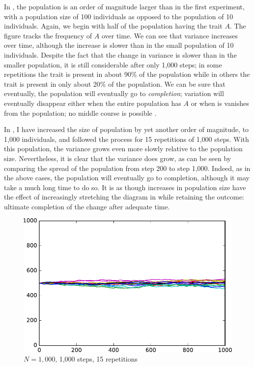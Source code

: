 \documentclass[output=paper]{langsci/langscibook}
\begin{document}
In , the population is an order of magnitude
larger than in the first experiment, with a population size of 100
individuals as opposed to the population of 10 individuals.  Again, we
begin with half of the population having the trait $A$. The figure
tracks the frequency of $A$ over time.  We can see that
variance increases over time, although the increase is slower than in
the small population of 10 individuals.  Despite the fact that the
change in variance is slower than in the smaller population, it is
still considerable after only 1,000 steps; in some repetitions the
trait is present in about 90\% of the population while in others the
trait is present in only about 20\% of the population.  We can be sure
that eventually, the population will eventually go to
\emph{completion}; variation will eventually disappear either when the
entire population has $A$ or when is vanishes from the population; no
middle course is possible \citep{sigmund:1993}.

In , I have increased the size of population by
yet another order of magnitude, to 1,000 individuals, and followed the
process for 15 repetitions of 1,000 steps.  With this population, the
variance grows even more slowly relative to the population size.
Nevertheless, it is clear that the variance does grow, as can be seen
by comparing the spread of the population from step 200 to step 1,000.
Indeed, as in the above cases, the population will eventually go to
completion, although it may take a much long time to do so.  It is as
though increases in population size have the effect of increasingly
stretching the diagram in  while retaining the
outcome: ultimate completion of the change after adequate time.

\begin{figure}
    \includegraphics[width=.75\linewidth]{img/pop1000_1000.pdf}
    \caption{$N = 1,000$, 1,000 steps, 15 repetitions\label{random_fig3}}
\end{figure}
\end{document}
